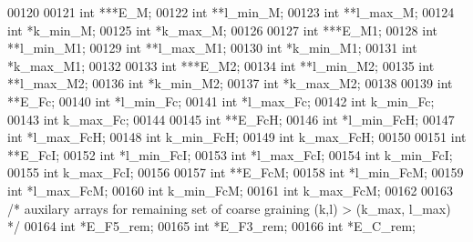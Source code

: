 \begin{DoxyCode}
00120 
00121       \textcolor{keywordtype}{int}             ***E\_M;
00122       \textcolor{keywordtype}{int}             **l\_min\_M;
00123       \textcolor{keywordtype}{int}             **l\_max\_M;
00124       \textcolor{keywordtype}{int}             *k\_min\_M;
00125       \textcolor{keywordtype}{int}             *k\_max\_M;
00126 
00127       \textcolor{keywordtype}{int}             ***E\_M1;
00128       \textcolor{keywordtype}{int}             **l\_min\_M1;
00129       \textcolor{keywordtype}{int}             **l\_max\_M1;
00130       \textcolor{keywordtype}{int}             *k\_min\_M1;
00131       \textcolor{keywordtype}{int}             *k\_max\_M1;
00132 
00133       \textcolor{keywordtype}{int}             ***E\_M2;
00134       \textcolor{keywordtype}{int}             **l\_min\_M2;
00135       \textcolor{keywordtype}{int}             **l\_max\_M2;
00136       \textcolor{keywordtype}{int}             *k\_min\_M2;
00137       \textcolor{keywordtype}{int}             *k\_max\_M2;
00138 
00139       \textcolor{keywordtype}{int}             **E\_Fc;
00140       \textcolor{keywordtype}{int}             *l\_min\_Fc;
00141       \textcolor{keywordtype}{int}             *l\_max\_Fc;
00142       \textcolor{keywordtype}{int}             k\_min\_Fc;
00143       \textcolor{keywordtype}{int}             k\_max\_Fc;
00144 
00145       \textcolor{keywordtype}{int}             **E\_FcH;
00146       \textcolor{keywordtype}{int}             *l\_min\_FcH;
00147       \textcolor{keywordtype}{int}             *l\_max\_FcH;
00148       \textcolor{keywordtype}{int}             k\_min\_FcH;
00149       \textcolor{keywordtype}{int}             k\_max\_FcH;
00150 
00151       \textcolor{keywordtype}{int}             **E\_FcI;
00152       \textcolor{keywordtype}{int}             *l\_min\_FcI;
00153       \textcolor{keywordtype}{int}             *l\_max\_FcI;
00154       \textcolor{keywordtype}{int}             k\_min\_FcI;
00155       \textcolor{keywordtype}{int}             k\_max\_FcI;
00156 
00157       \textcolor{keywordtype}{int}             **E\_FcM;
00158       \textcolor{keywordtype}{int}             *l\_min\_FcM;
00159       \textcolor{keywordtype}{int}             *l\_max\_FcM;
00160       \textcolor{keywordtype}{int}             k\_min\_FcM;
00161       \textcolor{keywordtype}{int}             k\_max\_FcM;
00162 
00163       \textcolor{comment}{/* auxilary arrays for remaining set of coarse graining (k,l) > (k\_max, l\_max) */}
00164       \textcolor{keywordtype}{int}             *E\_F5\_rem;
00165       \textcolor{keywordtype}{int}             *E\_F3\_rem;
00166       \textcolor{keywordtype}{int}             *E\_C\_rem;

\end{DoxyCode}

